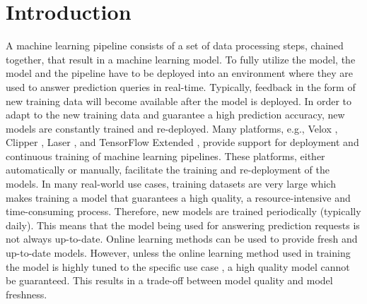 \section{Introduction} \label{introduction}
A machine learning pipeline consists of a set of data processing steps, chained together, that result in a machine learning model.
To fully utilize the model,  the model and the pipeline have to be deployed into an environment where they are used to answer prediction queries in real-time.
Typically, feedback in the form of new training data will become available after the model is deployed.
In order to adapt to the new training data and guarantee a high prediction accuracy, new models are constantly trained and re-deployed.
Many platforms, e.g., Velox \cite{crankshaw2014missing}, Clipper \cite{crankshaw2016clipper}, Laser \cite{agarwal2014laser}, and TensorFlow Extended \cite{baylor2017tfx}, provide support for deployment and continuous training of machine learning pipelines. 
These platforms, either automatically or manually, facilitate the training and re-deployment of the models.
In many real-world use cases, training datasets are very large which makes training a model that guarantees a high quality, a resource-intensive and time-consuming process.
Therefore, new models are trained periodically (typically daily).
This means that the model being used for answering prediction requests is not always up-to-date.
Online learning methods can be used to provide fresh and up-to-date models.
However, unless the online learning method used in training the model is highly tuned to the specific use case \cite{ma2009identifying}, a high quality model cannot be guaranteed.
This results in a trade-off between model quality and model freshness.

